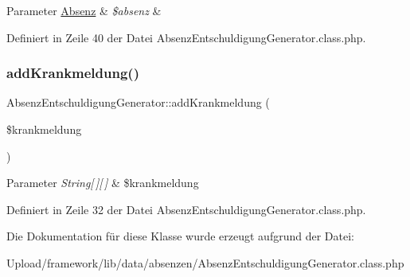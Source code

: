 \begin{DoxyParams}[1]{Parameter}
\mbox{\hyperlink{class_absenz}{Absenz}} & {\em \$absenz} & \\
\hline
\end{DoxyParams}


Definiert in Zeile 40 der Datei Absenz\+Entschuldigung\+Generator.\+class.\+php.

\mbox{\label{class_absenz_entschuldigung_generator_a2d41f76e87c23924c853fb521a6f3369}} 
\subsubsection{\texorpdfstring{add\+Krankmeldung()}{addKrankmeldung()}}
{\footnotesize\ttfamily Absenz\+Entschuldigung\+Generator\+::add\+Krankmeldung (\begin{DoxyParamCaption}\item[{}]{\$krankmeldung }\end{DoxyParamCaption})}


\begin{DoxyParams}{Parameter}
{\em String\mbox{[}$\,$\mbox{]}\mbox{[}$\,$\mbox{]}} & \$krankmeldung \\
\hline
\end{DoxyParams}


Definiert in Zeile 32 der Datei Absenz\+Entschuldigung\+Generator.\+class.\+php.



Die Dokumentation für diese Klasse wurde erzeugt aufgrund der Datei\+:\begin{DoxyCompactItemize}
\item 
Upload/framework/lib/data/absenzen/Absenz\+Entschuldigung\+Generator.\+class.\+php\end{DoxyCompactItemize}
